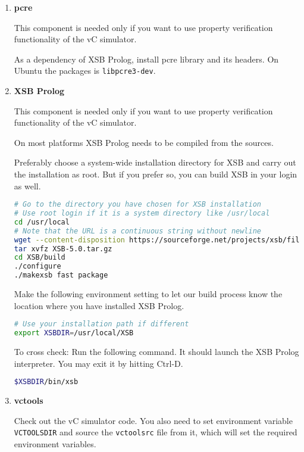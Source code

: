 \documentclass[12pt,a4paper]{article}
\begin{document}
\begin{enumerate}
\item \textbf{pcre}

This component is needed only if you want to use property verification functionality of the vC simulator.

As a dependency of XSB Prolog, install pcre library and its headers. On Ubuntu the packages is \texttt{libpcre3-dev}.

\item \textbf{XSB Prolog}

This component is needed only if you want to use property verification functionality of the vC simulator.

On most platforms XSB Prolog needs to be compiled from the sources.

Preferably choose a system-wide installation directory for XSB and carry out the installation as root. But if you prefer so, you can build XSB in your login as well.

\begin{lstlisting}[language=bash,style=snippet]
# Go to the directory you have chosen for XSB installation
# Use root login if it is a system directory like /usr/local
cd /usr/local
# Note that the URL is a continuous string without newline
wget --content-disposition https://sourceforge.net/projects/xsb/files/xsb/5.0%20%28Green%20Tea%29/XSB-5.0.tar.gz/download
tar xvfz XSB-5.0.tar.gz
cd XSB/build
./configure
./makexsb fast package
\end{lstlisting}

Make the following environment setting to let our build process know the location where you have installed XSB Prolog.

\begin{lstlisting}[language=bash,style=snippet]
# Use your installation path if different
export XSBDIR=/usr/local/XSB
\end{lstlisting}

To cross check: Run the following command. It should launch the XSB Prolog interpreter. You may exit it by hitting Ctrl-D.

\begin{lstlisting}[language=bash,style=snippet]
$XSBDIR/bin/xsb
\end{lstlisting}

\item \textbf{vctools}

Check out the vC simulator code. You also need to set environment variable \texttt{VCTOOLSDIR} and source the \texttt{vctoolsrc} file from it, which will set the required environment variables.


\end{enumerate}
\end{document}
